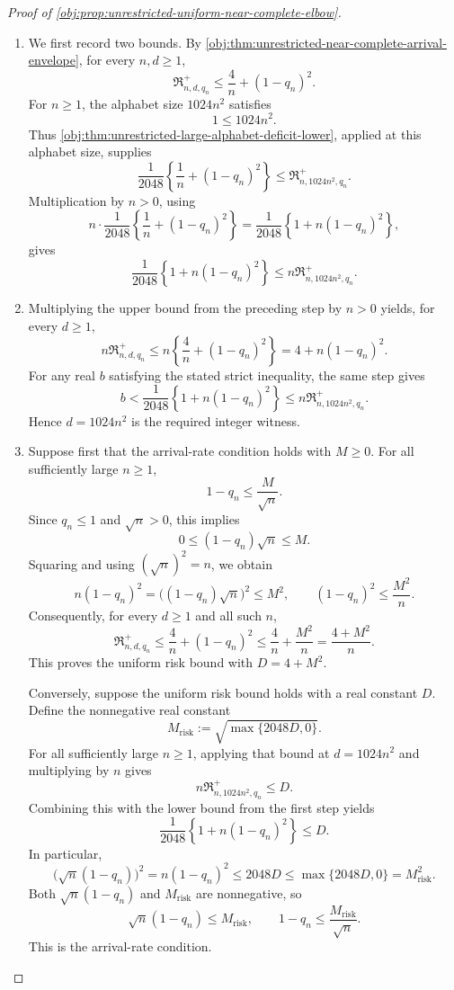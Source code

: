 \documentclass[11pt]{article}
\begin{document}
\begin{proof}[Proof of \cref{obj:prop:unrestricted-uniform-near-complete-elbow}]
\begin{enumerate}
\item We first record two bounds. By \cref{obj:thm:unrestricted-near-complete-arrival-envelope}, for every \(n,d\ge1\),
\[
\mathfrak R^{+}_{n,d,q_n}\le \frac4n+(1-q_n)^2.
\]
For \(n\ge1\), the alphabet size \(1024n^2\) satisfies
\[
1\le1024n^2.
\]
Thus \cref{obj:thm:unrestricted-large-alphabet-deficit-lower}, applied at this alphabet size, supplies
\[
\frac1{2048}\left\{\frac1n+(1-q_n)^2\right\}
\le \mathfrak R^{+}_{n,1024n^2,q_n}.
\]
Multiplication by \(n>0\), using
\[
n\cdot\frac1{2048}\left\{\frac1n+(1-q_n)^2\right\}
=\frac1{2048}\left\{1+n(1-q_n)^2\right\},
\]
gives
\[
\frac1{2048}\left\{1+n(1-q_n)^2\right\}
\le n\mathfrak R^{+}_{n,1024n^2,q_n}.
\]

\item Multiplying the upper bound from the preceding step by \(n>0\) yields, for every \(d\ge1\),
\[
n\mathfrak R^{+}_{n,d,q_n}
\le n\left\{\frac4n+(1-q_n)^2\right\}
=4+n(1-q_n)^2.
\]
For any real \(b\) satisfying the stated strict inequality, the same step gives
\[
b<
\frac1{2048}\left\{1+n(1-q_n)^2\right\}
\le n\mathfrak R^{+}_{n,1024n^2,q_n}.
\]
Hence \(d=1024n^2\) is the required integer witness.

\item Suppose first that the arrival-rate condition holds with \(M\ge0\). For all sufficiently large \(n\ge1\),
\[
1-q_n\le\frac{M}{\sqrt n}.
\]
Since \(q_n\le1\) and \(\sqrt n>0\), this implies
\[
0\le(1-q_n)\sqrt n\le M.
\]
Squaring and using \((\sqrt n)^2=n\), we obtain
\[
n(1-q_n)^2
=\bigl((1-q_n)\sqrt n\bigr)^2
\le M^2,
\qquad
(1-q_n)^2\le\frac{M^2}{n}.
\]
Consequently, for every \(d\ge1\) and all such \(n\),
\[
\mathfrak R^{+}_{n,d,q_n}
\le\frac4n+(1-q_n)^2
\le\frac4n+\frac{M^2}{n}
=\frac{4+M^2}{n}.
\]
This proves the uniform risk bound with \(D=4+M^2\).

Conversely, suppose the uniform risk bound holds with a real constant \(D\). Define the nonnegative real constant
\[
M_{\mathrm{risk}}:=\sqrt{\max\{2048D,0\}}.
\]
For all sufficiently large \(n\ge1\), applying that bound at \(d=1024n^2\) and multiplying by \(n\) gives
\[
n\mathfrak R^{+}_{n,1024n^2,q_n}\le D.
\]
Combining this with the lower bound from the first step yields
\[
\frac1{2048}\left\{1+n(1-q_n)^2\right\}\le D.
\]
In particular,
\[
\bigl(\sqrt n(1-q_n)\bigr)^2
=n(1-q_n)^2
\le2048D
\le\max\{2048D,0\}
=M_{\mathrm{risk}}^2.
\]
Both \(\sqrt n(1-q_n)\) and \(M_{\mathrm{risk}}\) are nonnegative, so
\[
\sqrt n(1-q_n)\le M_{\mathrm{risk}},
\qquad
1-q_n\le\frac{M_{\mathrm{risk}}}{\sqrt n}.
\]
This is the arrival-rate condition.


\end{enumerate}
\end{proof}
\end{document}
